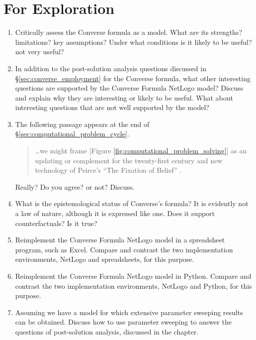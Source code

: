 \section{For Exploration}

\begin{enumerate}
\item Critically assess the Converse formula as a model. What are its strengths? limitations? key assumptions? Under what conditions is it likely to be useful? not very useful?
\item In addition to the post-solution analysis questions discussed in \S\ref{sec:converse_employment} for the Converse formula, what other interesting questions are supported by the Converse Formula NetLogo model? Discuss and explain why they are interesting or likely to be useful. What about interesting questions that are not well supported by the model?
\item The following passage appears at the end of \S\ref{sec:computational_problem_cycle}.
\begin{quote}
\ldots we might frame [Figure \ref{fig:computational_problem_solving}] as an updating or complement for the twenty-first century and new technology of Peirce's ``The Fixation of Belief''  \cite{peirce_fixation}. 
\end{quote}
Really? Do you agree? or not? Discuss.
\item What is the epistemological status of Converse's formula? It is evidently not a law of nature, although it is expressed like one. Does it support counterfactuals? Is it true?
\item Reimplement the Converse Formula NetLogo model in a spreadsheet program, such as Excel. Compare and contrast the two implementation environments, NetLogo and spreadsheets, for this purpose.
\item Reimplement the Converse Formula  NetLogo model in Python. Compare and contrast the two implementation environments, NetLogo and Python, for this purpose.

\item Assuming we have a model for which extensive parameter sweeping results can be obtained. Discuss how to use parameter sweeping to answer the questions of post-solution analysis, discussed in the chapter.
\end{enumerate}



